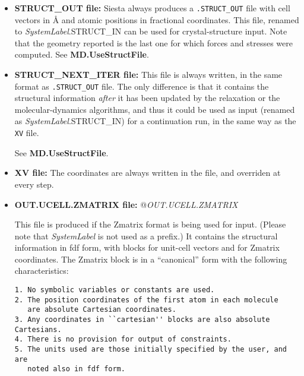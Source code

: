 \begin{itemize}

\item\textbf{STRUCT\_OUT file:}
Siesta always produces a \texttt{.STRUCT\_OUT} file with cell vectors in {\AA}
and atomic positions in fractional coordinates. This file, renamed to
\textit{SystemLabel}.STRUCT\_IN can be used for crystal-structure input.
Note that the geometry reported is the last one for which forces and
stresses were computed.
See \textbf{MD.UseStructFile}.

\item\textbf{STRUCT\_NEXT\_ITER file:}
This file is always written, in the same format as \texttt{.STRUCT\_OUT}
file. The only difference is that it contains the structural
information \emph{after} it has been updated by the relaxation or the
molecular-dynamics
algorithms, and thus it could be used as input (renamed as
\textit{SystemLabel}.STRUCT\_IN) for a continuation run, in the same way
as the \texttt{XV} file.

See \textbf{MD.UseStructFile}.

\item\textbf{XV file:} The coordinates are always written in the  file, and overriden at every step.

\item\textbf{OUT.UCELL.ZMATRIX file:}
@{\textit{OUT.UCELL.ZMATRIX}}

This file is produced if the Zmatrix format is being used for
input. (Please note that \textit{SystemLabel} is not used as a prefix.)
It contains the structural information in fdf form, with
blocks for unit-cell vectors and for Zmatrix coordinates. The
Zmatrix block is in a ``canonical'' form with the following
characteristics:

\begin{verbatim}
1. No symbolic variables or constants are used.
2. The position coordinates of the first atom in each molecule
   are absolute Cartesian coordinates.
3. Any coordinates in ``cartesian'' blocks are also absolute Cartesians.
4. There is no provision for output of constraints.
5. The units used are those initially specified by the user, and are
   noted also in fdf form.
\end{verbatim}


\end{itemize}
